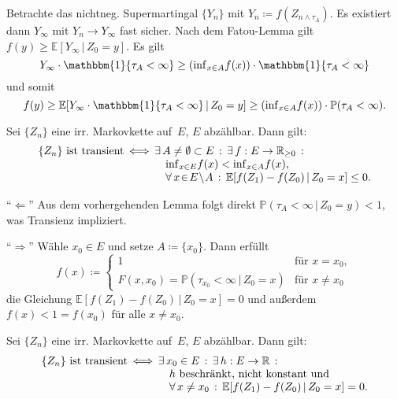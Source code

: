 \documentclass{cheat-sheet}
\renewcommand{\P}{\mathbb{P}} %
\newcommand{\E}{\mathbb{E}} %
\newcommand{\ind}{\mathbbm{1}} %
\begin{document}
\begin{beweisskizze}
  Betrachte das nichtneg. Supermartingal $\{ Y_n \}$ mit $Y_n \coloneqq f(Z_{n \wedge \tau_A})$.
  Es existiert dann $Y_\infty$ mit $Y_n \to Y_\infty$ fast sicher.
  Nach dem Fatou-Lemma gilt $f(y) \geq \E[ Y_\infty \,|\, Z_0 = y]$.
  Es gilt
  \[ Y_\infty \cdot \ind \{ \tau_A < \infty \} \geq ({\inf}_{x \in A} f(x)) \cdot \ind \{ \tau_A < \infty \} \]
  und somit
  \[
    f(y)
    \geq \E[ Y_\infty \cdot \ind \{ \tau_A < \infty \} \,|\, Z_0 = y]
    \geq ({\inf}_{x \in A} f(x)) \cdot \P(\tau_A < \infty).
  \]
\end{beweisskizze}

\begin{satz}
  Sei $\{ Z_n \}$ eine irr. Markovkette auf~$E$, $E$ abzählbar.
  Dann gilt:
  \[
    \arraycolsep=1pt
    \begin{array}{r c l}
      \{ Z_n \} \text{ ist transient}
      &\iff&
      \ex{A \neq \emptyset \subset E} \ex{f : E \to \R_{\geq 0}} \\
      && \quad {\inf}_{x \in E} f(x) < {\inf}_{x \in A} f(x), \\
      && \quad \fa{x \!\in\! E \!\setminus\! A} \E[ f(Z_1) - f(Z_0) \,|\, Z_0 = x ] \leq 0.
    \end{array}
  \]
\end{satz}

\begin{beweisskizze}
  "`$\Leftarrow$"'
  Aus dem vorhergehenden Lemma folgt direkt $\P(\tau_A < \infty \,|\, Z_0 = y) < 1$, was Transienz impliziert.

  "`$\Rightarrow$"'
  Wähle $x_0 \in E$ und setze $A \coloneqq \{ x_0 \}$.
  Dann erfüllt
  \[
    f(x) \coloneqq \begin{cases}
      1 & \text{für } x = x_0, \\
      F(x, x_0) = \P(\tau_{x_0} < \infty \,|\, Z_0 = x) & \text{für } x \neq x_0
    \end{cases}
  \]
  die Gleichung $\E[ f(Z_1) - f(Z_0) \,|\, Z_0 = x ] = 0$ und außerdem $f(x) < 1 = f(x_0)$ für alle $x \neq x_0$.
\end{beweisskizze}

\begin{kor}
  Sei $\{ Z_n \}$ eine irr. Markovkette auf~$E$, $E$ abzählbar.
  Dann gilt:
  \[
    \arraycolsep=1pt
    \begin{array}{r c l}
      \{ Z_n \} \text{ ist transient}
      &\iff&
      \ex{x_0 \in E} \ex{h : E \to \R} \\
      && \quad \text{$h$ beschränkt, nicht konstant und} \\
      && \quad \fa{x \neq x_0} \E[ f(Z_1) - f(Z_0) \,|\, Z_0 = x ] = 0.
    \end{array}
  \]
\end{kor}
\end{document}
